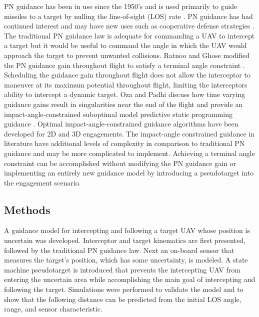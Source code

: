 \documentclass[]{aiaa-tc}%
\begin{document}
PN guidance has been in use since the 1950's \cite{zarchan} and is used primarily to guide missiles to a target by nulling the line-of-sight (LOS) rate \cite{shneydor1998missile,yanushevsky2007modern}. PN guidance has had continued interest and may have new uses such as cooperative defense strategies \cite{isaac}. The traditional PN guidance law is adequate for commanding a UAV to intercept a target but it would be useful to command the angle in which the UAV would approach the target to prevent unwanted collisions. Ratnoo and Ghose modified the PN guidance gain throughout flight to satisfy a terminal angle constraint \cite{ratnoo2009satisfying}. Scheduling the guidance gain throughout flight does not allow the interceptor to maneuver at its maximum potential throughout flight, limiting the interceptors ability to intercept a dynamic target. Oza and Padhi discuss how time varying guidance gains result in singularities near the end of the flight and provide an impact-angle-constrained suboptimal model predictive static programming guidance \cite{oza2012impact}. Optimal impact-angle-constrained guidance algorithms have been developed for 2D \cite{park2013optimal} and 3D \cite{kumar2014three} engagements. The impact-angle constrained guidance in literature have additional levels of complexity in comparison to traditional PN guidance and may be more complicated to implement. Achieving a terminal angle constraint can be accomplished without modifying the PN guidance gain or implementing an entirely new guidance model by introducing a pseudotarget into the engagement scenario.


\subsection{Methods}
A guidance model for intercepting and following a target UAV whose position is uncertain was developed. Interceptor and target kinematics are first presented, followed by the traditional PN guidance law. Next an on-board sensor that measures the target's position, which has some uncertainty, is modeled. A state machine pseudotarget is introduced that prevents the intercepting UAV from entering the uncertain area while accomplishing the main goal of intercepting and following the target. Simulations were performed to validate the model and to show that the following distance can be predicted from the initial LOS angle, range, and sensor characteristic.



\end{document}
